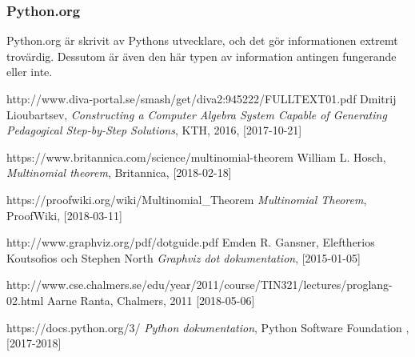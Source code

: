 \documentclass[12pt,a4paper]{article}
\begin{document}
\subsubsection{Python.org}
Python.org är skrivit av Pythons utvecklare, och det gör informationen extremt trovärdig. Dessutom är även den här typen av information antingen fungerande eller inte. 
\newpage
\begin{thebibliography}{9}

  http://www.diva-portal.se/smash/get/diva2:945222/FULLTEXT01.pdf
  Dmitrij Lioubartsev,
  \textit{Constructing a Computer Algebra System Capable of Generating Pedagogical Step-by-Step Solutions},
  KTH,
  2016,
  [2017-10-21]

  https://www.britannica.com/science/multinomial-theorem
  William L. Hosch,
  \textit{Multinomial theorem},
  Britannica,
  [2018-02-18]

  https://proofwiki.org/wiki/Multinomial\_Theorem
  \textit{Multinomial Theorem},
  ProofWiki,
  [2018-03-11]

  http://www.graphviz.org/pdf/dotguide.pdf
  Emden R. Gansner, Eleftherios Koutsofios och Stephen North
  \textit{Graphviz dot dokumentation},
  [2015-01-05]

  http://www.cse.chalmers.se/edu/year/2011/course/TIN321/lectures/proglang-02.html
  Aarne Ranta,
  Chalmers,
  2011
  [2018-05-06]

  https://docs.python.org/3/
  \textit{Python dokumentation},
  Python Software Foundation ,
  [2017-2018] 
\end{thebibliography}
\newpage
\end{document}
